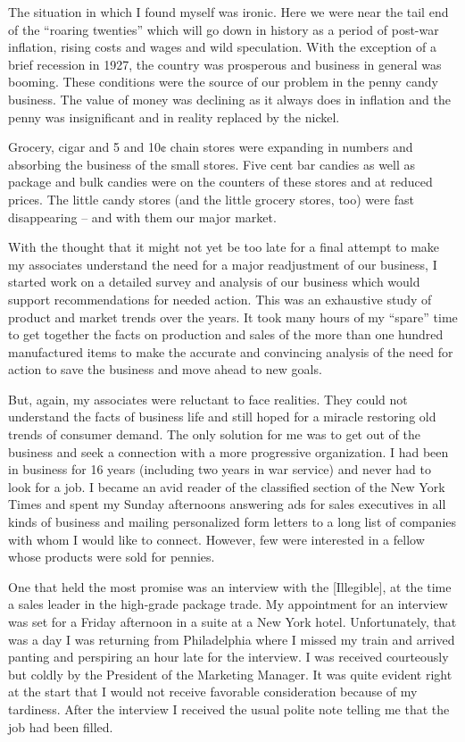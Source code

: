 \documentclass[12pt]{book}              %
\begin{document}
The situation in which I found myself was ironic. Here we were near the tail end of the ``roaring twenties'' which will go down in history as a period of post-war inflation, rising costs and wages and wild speculation. With the exception of a brief recession in 1927, the country was prosperous and business in general was booming. These conditions were the source of our problem in the penny candy business. The value of money was declining as it always does in inflation and the penny was insignificant and in reality replaced by the nickel.

Grocery, cigar and 5 and 10$\cent$ chain stores were expanding in numbers and absorbing the business of the small stores. Five cent bar candies as well as package and bulk candies were on the counters of these stores and at reduced prices. The little candy stores (and the little grocery stores, too) were fast disappearing -- and with them our major market. 

With the thought that it might not yet be too late for a final attempt to make my associates understand the need for a major readjustment of our business, I started work on a detailed survey and analysis of our business which would support recommendations for needed action. This was an exhaustive study of product and market trends over the years. It took many hours of my ``spare'' time to get together the facts on production and sales of the more than one hundred manufactured items to make the accurate and convincing analysis of the need for action to save the business and move ahead to new goals. 

But, again, my associates were reluctant to face realities. They could not understand the facts of business life and still hoped for a miracle restoring old trends of consumer demand. The only solution for me was to get out of the business and seek a connection with a more progressive organization. I had been in business for 16 years (including two years in war service) and never had to look for a job. I became an avid reader of the classified section of the New York Times and spent my Sunday afternoons answering ads for sales executives in all kinds of business and mailing personalized form letters to a long list of companies with whom I would like to connect. However, few were interested in a fellow whose products were sold for pennies. 

One that held the most promise was an interview with the [Illegible], at the time a sales leader in the high-grade package trade. My appointment for an interview was set for a Friday afternoon in a suite at a New York hotel. Unfortunately, that was a day I was returning from Philadelphia where I missed my train and arrived panting and perspiring an hour late for the interview. I was received courteously but coldly by the President of the Marketing Manager. It was quite evident right at the start that I would not receive favorable consideration because of my tardiness. After the interview I received the usual polite note telling me that the job had been filled. 
\end{document}
